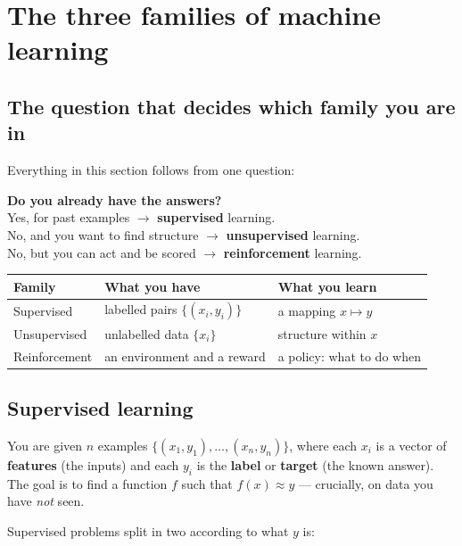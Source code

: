 \documentclass[11pt]{article}
\begin{document}
\newpage
\section{The three families of machine learning}
\label{sec:families}

\subsection{The question that decides which family you are in}

Everything in this section follows from one question:

\begin{keyidea}
\textbf{Do you already have the answers?}\\[3pt]
Yes, for past examples $\rightarrow$ \textbf{supervised} learning.\\
No, and you want to find structure $\rightarrow$ \textbf{unsupervised} learning.\\
No, but you can act and be scored $\rightarrow$ \textbf{reinforcement} learning.
\end{keyidea}

\begin{center}
\begin{tabular}{@{}lll@{}}
\toprule
\textbf{Family} & \textbf{What you have} & \textbf{What you learn}\\
\midrule
Supervised & labelled pairs $\{(x_i, y_i)\}$ & a mapping $x \mapsto y$\\
Unsupervised & unlabelled data $\{x_i\}$ & structure within $x$\\
Reinforcement & an environment and a reward & a policy: what to do when\\
\bottomrule
\end{tabular}
\end{center}

\subsection{Supervised learning}

You are given $n$ examples $\{(x_1, y_1), \dots, (x_n, y_n)\}$, where each $x_i$
is a vector of \textbf{features} (the inputs) and each $y_i$ is the
\textbf{label} or \textbf{target} (the known answer). The goal is to find a
function $f$ such that $f(x) \approx y$ --- crucially, on data you have
\emph{not} seen.

Supervised problems split in two according to what $y$ is:
\end{document}
